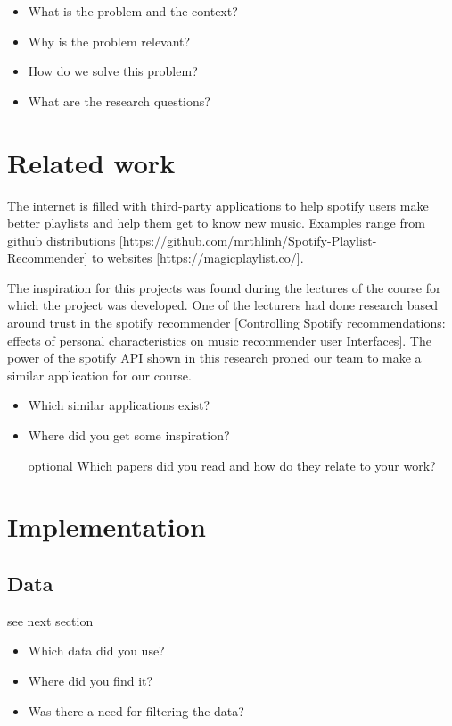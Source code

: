 \documentclass[sigconf,nonacm]{acmart}
\begin{document}
\begin{itemize}
    \item What is the problem and the context?
    \item Why is the problem relevant?
    \item How do we solve this problem?
    \item What are the research questions?
\end{itemize}

\section{Related work}
The internet is filled with third-party applications to help spotify users make better playlists and help them get to know new music. Examples range from github distributions [https://github.com/mrthlinh/Spotify-Playlist-Recommender] to websites [https://magicplaylist.co/].

The inspiration for this projects was found during the lectures of the  course for which the project was developed. One of the lecturers had done research based around trust in the spotify recommender [Controlling Spotify recommendations: effects of personal characteristics on music recommender user Interfaces]. The power of the spotify API shown in this research proned our team to make a similar application for our course.

\begin{itemize}
    \item Which similar applications exist?
    \item Where did you get some inspiration?
    \item [optional] Which papers did you read and how do they relate to your work?
\end{itemize}

\section{Implementation}
\subsection{Data}
see next section
\begin{itemize}
    \item Which data did you use?
    \item Where did you find it?
    \item Was there a need for filtering the data?
\end{itemize}
\end{document}
